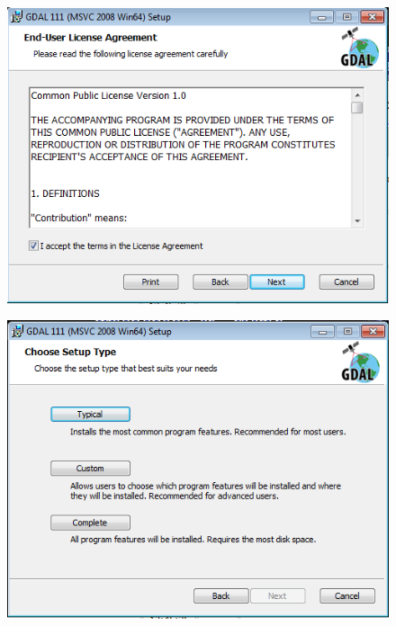 \documentclass[11pt, spanish]{memoir}
\begin{document}
\begin{figure}[H]
\centering
\includegraphics[width=14cm]{gdal2.png}
\end{figure}

\begin{figure}[H]
\centering
\includegraphics[width=14cm]{gdal3.png}
\end{figure}
\end{document}
